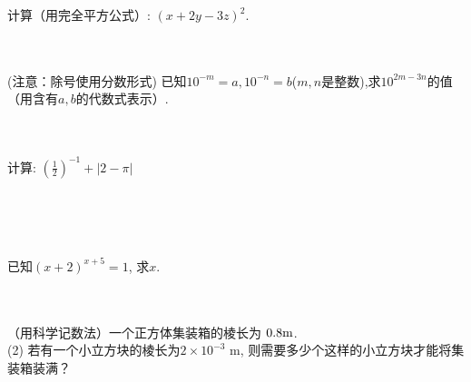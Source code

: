 \item{
    计算（用完全平方公式）: $(x+2y-3z)^2$.
}
\\ \\ \\

\item{
    (注意：除号使用分数形式) 已知$10^{-m}=a, 10^{-n}=b$($m, n$是整数),求$10^{2m-3n}$的值（用含有$a, b$的代数式表示）.
}
\\ \\ \\

\begin{comment}
\item{
    已知$2^x=3, 2^y=6, 2^z=12$,判断下列有关$x, y, z$的数量关系式的对错.\\
    (1) $x+z=2y$\\
    (2) $x+y+3=2z$\\
    (3) $4x=z$\\
    (4) $x+1=y$
}
\\ \\
\end{comment}

\item{
    计算: $ (\frac{1}{2})^{-1} + \lvert 2-\pi \rvert $
    \iffalse
    \fangsong\zihao{4}
    思路: 去绝对值符号,运算到底.

    解答: 
    \begin{align*}
        \mbox{原式} &= 3 + \pi - 3\\
        &= \pi.
    \end{align*}
    \fi
}
\\ \\ \\
\item{
    已知$(x+2)^{x+5}=1$, 求$x$.
}
\\ \\ \\
\item{
    （用科学记数法）一个正方体集装箱的棱长为 $0.8 \rm{m}$.\\
    (2) 若有一个小立方块的棱长为$2\times 10^{-3} $ m, 则需要多少个这样的小立方块才能将集装箱装满？
    \iffalse
    \fangsong\zihao{4}
    思路: 问题（2）注意简便运算.
    \fi
}
\\ \\ \\
